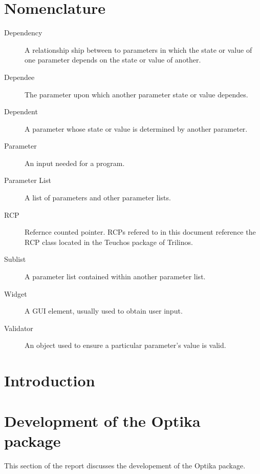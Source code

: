 \documentclass[pdf,ps2pdf,12pt,report,strict,blank]{SANDreport}
\begin{document}
    \chapter*{Nomenclature}
    \begin{description}
	\item[Dependency]
	    A relationship ship between to parameters in which the state
		or value of one parameter depends on the state or value of
		another.
	\item[Dependee]
		The parameter upon which another parameter state or value dependes.
	\item[Dependent]
		A parameter whose state or value is determined by another
		parameter.
	\item[Parameter]
	    An input needed for a program.
	\item[Parameter List]
	    A list of parameters and other parameter lists.
	\item[RCP]
	    Refernce counted pointer. RCPs refered to in this document reference the
		RCP class located in the Teuchos package of Trilinos.
	\item[Sublist]
	    A parameter list contained within another parameter list.
	\item[Widget]
		A GUI element, usually used to obtain user input.
	\item[Validator]
		An object used to ensure a particular parameter's value is valid.
    \end{description}


    \SANDmain		%

    \chapter{Introduction}
	\label{Intro}
	


    \chapter{Development of the Optika package}
	This section of the report discusses the developement of the Optika package.
	


\end{document}
